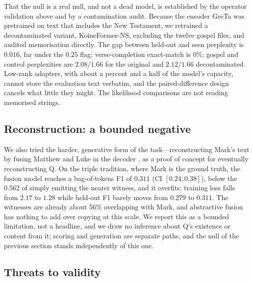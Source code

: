 \documentclass[11pt,letterpaper]{article}
\begin{document}
That the null is a real null, and not a dead model, is established by the operator validation above and by a contamination audit. Because the encoder GreTa was pretrained on text that includes the New Testament, we retrained a decontaminated variant, KoineFormer-NS, excluding the twelve gospel files, and audited memorisation directly. The gap between held-out and seen perplexity is $0.016$, far under the $0.25$ flag; verse-completion exact-match is $0\%$; gospel and control perplexities are $2.08/1.66$ for the original and $2.12/1.66$ decontaminated. Low-rank adapters, with about a percent and a half of the model's capacity, cannot store the evaluation text verbatim, and the paired-difference design cancels what little they might. The likelihood comparisons are not reading memorised strings.

\subsection{Reconstruction: a bounded negative}

We also tried the harder, generative form of the task---reconstructing Mark's text by fusing Matthew and Luke in the decoder \citep{izacard2021}, as a proof of concept for eventually reconstructing Q. On the triple tradition, where Mark is the ground truth, the fusion model reaches a bag-of-tokens F1 of $0.311$ (CI $[0.24, 0.38]$), below the $0.562$ of simply emitting the nearer witness, and it overfits: training loss falls from $2.17$ to $1.28$ while held-out F1 barely moves from $0.279$ to $0.311$. The witnesses are already about 56\% overlapping with Mark, and abstractive fusion has nothing to add over copying at this scale. We report this as a bounded limitation, not a headline, and we draw no inference about Q's existence or content from it; scoring and generation are separate paths, and the null of the previous section stands independently of this one.

\subsection{Threats to validity}
\end{document}
